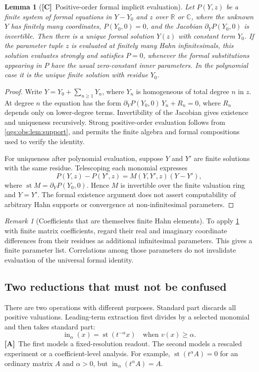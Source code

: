 \documentclass[11pt,oneside]{article}
\numberwithin{equation}{section}
\theoremstyle{plain}
\newtheorem{lemma}[lemma]{Lemma}
\theoremstyle{definition}
\theoremstyle{remark}
\newtheorem{remark}[remark]{Remark}
\newcommand{\R}{\mathbb R}
\newcommand{\C}{\mathbb C}
\DeclareMathOperator{\st}{st}
\DeclareMathOperator{\ini}{in}
\newcommand{\TC}{\textcolor{TierC}{\textsf{\bfseries[C]}}}
\newcommand{\TA}{\textcolor{TierA}{\textsf{\bfseries[A]}}}
\begin{document}
\begin{lemma}[\TC\ Positive-order formal implicit evaluation]\label{qgs:lem:implicit}
Let $P(Y,z)$ be a finite system of formal equations in $Y-Y_0$ and $z$ over $\R$ or $\C$, where the unknown $Y$ has finitely many coordinates, $P(Y_0,0)=0$, and the Jacobian $\partial_YP(Y_0,0)$ is invertible. Then there is a unique formal solution $Y(z)$ with constant term $Y_0$. If the parameter tuple $z$ is evaluated at finitely many Hahn infinitesimals, this solution evaluates strongly and satisfies $P=0$, whenever the formal substitutions appearing in $P$ have the usual zero-constant inner parameters. In the polynomial case it is the unique finite solution with residue $Y_0$.
\end{lemma}
\begin{proof}
Write $Y=Y_0+\sum_{n\ge1}Y_n$, where $Y_n$ is homogeneous of total degree $n$ in $z$. At degree $n$ the equation has the form $\partial_YP(Y_0,0)\,Y_n+R_n=0$, where $R_n$ depends only on lower-degree terms. Invertibility of the Jacobian gives existence and uniqueness recursively. Strong positive-order evaluation follows from \cref{qgs:obs:lem:support}, and permits the finite algebra and formal compositions used to verify the identity.

For uniqueness after polynomial evaluation, suppose $Y$ and $Y'$ are finite solutions with the same residue. Telescoping each monomial expresses
\[
 P(Y,z)-P(Y',z)=M(Y,Y',z)(Y-Y'),
\]
where $\st M=\partial_YP(Y_0,0)$. Hence $M$ is invertible over the finite valuation ring and $Y=Y'$. The formal existence argument does not assert computability of arbitrary Hahn supports or convergence at non-infinitesimal parameters.
\end{proof}

\begin{remark}[Coefficients that are themselves finite Hahn elements]\label{qgs:rem:coefficients}
To apply \cref{qgs:lem:implicit} with finite matrix coefficients, regard their real and imaginary coordinate differences from their residues as additional infinitesimal parameters. This gives a finite parameter list. Correlations among those parameters do not invalidate evaluation of the universal formal identity.
\end{remark}

\subsection{Two reductions that must not be confused}\label{qgs:obs:sec:reductions}
There are two operations with different purposes. Standard part discards all positive valuations. Leading-term extraction first divides by a selected monomial and then takes standard part:
\begin{equation}\label{qgs:obs:eq:initial}
 \ini_\alpha(x)=\st(t^{-\alpha}x)
 \quad\text{when }v(x)\ge\alpha.
\end{equation}
\TA\ The first models a fixed-resolution readout. The second models a rescaled experiment or a coefficient-level analysis. For example, $\st(t^\alpha A)=0$ for an ordinary matrix $A$ and $\alpha>0$, but $\ini_\alpha(t^\alpha A)=A$.
\end{document}
